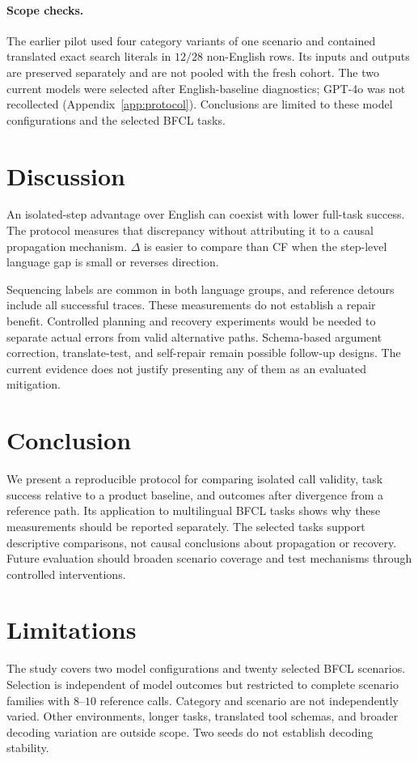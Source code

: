 \documentclass[11pt]{article}
\begin{document}
\paragraph{Scope checks.} The earlier pilot used four category variants of
one scenario and contained translated exact search literals in $12/28$
non-English rows. Its inputs and outputs are preserved separately and are
not pooled with the fresh cohort. The two current models were selected after
English-baseline diagnostics; GPT-4o was not recollected
(Appendix~\ref{app:protocol}). Conclusions are limited to these model
configurations and the selected BFCL tasks.

\section{Discussion}
\label{sec:discussion}
An isolated-step advantage over English can coexist with lower full-task
success. The protocol measures that discrepancy without attributing it to a
causal propagation mechanism. $\Delta$ is easier to compare than CF when
the step-level language gap is small or reverses direction.

Sequencing labels are common in both language groups, and reference detours
include all successful traces. These measurements do not establish a repair
benefit. Controlled planning and recovery experiments would be needed to
separate actual errors from valid alternative paths. Schema-based argument
correction, translate-test, and self-repair remain possible follow-up designs.
The current evidence does not justify presenting any of them as an evaluated
mitigation.

\section{Conclusion}
\label{sec:conclusion}
We present a reproducible protocol for comparing isolated call validity,
task success relative to a product baseline, and outcomes after divergence
from a reference path. Its application to multilingual BFCL tasks shows
why these measurements should be reported separately. The selected tasks
support descriptive comparisons, not causal conclusions about propagation
or recovery. Future evaluation should broaden scenario coverage and test
mechanisms through controlled interventions.

\section*{Limitations}
The study covers two model configurations and twenty selected BFCL scenarios.
Selection is independent of model outcomes but restricted to complete
scenario families with $8$--$10$ reference calls. Category and scenario are
not independently varied. Other environments, longer tasks, translated tool
schemas, and broader decoding variation are outside scope. Two seeds do
not establish decoding stability.
\end{document}
